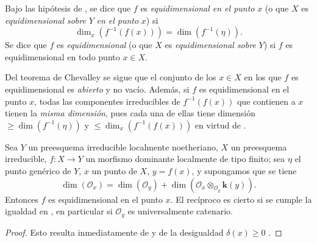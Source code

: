 \begin{definition}[13.2.2]
\label{IV.13.2.2}
Bajo las hipótesis de , se dice que $f$ es \emph{equidimensional en el punto} $x$ (o que $X$ es \emph{equidimensional sobre} $Y$ \emph{en el punto} $x$) si
\[
  \dim_x(f^{-1}(f(x)))=\dim(f^{-1}(\eta)).
\]
Se dice que $f$ es \emph{equidimensional} (o que $X$ es \emph{equidimensional sobre} $Y$) si $f$ es equidimensional en todo punto $x\in X$.
\end{definition}

Del teorema de Chevalley  se sigue que el conjunto de los $x\in X$ en los que $f$ es equidimensional es \emph{abierto} y no vacío.
Además, si $f$ es equidimensional en el punto $x$, todas las componentes irreducibles de $f^{-1}(f(x))$ que contienen a $x$ tienen la \emph{misma dimensión}, pues cada una de ellas tiene dimensión $\geq\dim(f^{-1}(\eta))$  y $\leq\dim_x(f^{-1}(f(x)))$ en virtud de .

\begin{proposition}[13.2.3]
\label{IV.13.2.3}
Sea $Y$ un preesquema irreducible localmente noetheriano, $X$ un preesquema irreducible, $f:X\to Y$ un morfismo \textup{dominante} localmente de tipo finito; sea $\eta$ el punto genérico de $Y$, $x$ un punto de $X$, $y=f(x)$, y supongamos que se tiene
\[
\tag{13.2.3.1}
\label{IV.13.2.3.1-fr}
  \dim(\mathcal O_x)=\dim(\mathcal O_y)
  +\dim(\mathcal O_x\otimes_{\mathcal O_y}\boldsymbol{k}(y)).
\]
Entonces $f$ es equidimensional en el punto $x$.
El recíproco es cierto si se cumple la igualdad en , en particular si $\mathcal O_y$ es universalmente catenario.
\end{proposition}

\begin{proof}
Esto resulta inmediatamente de  y de la desigualdad $\delta(x)\geq0$ .
\end{proof}

